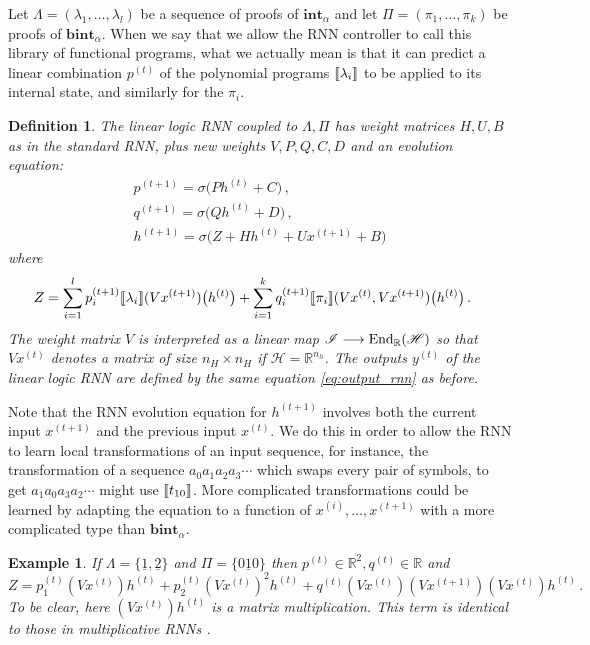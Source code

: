 \documentclass[english,letter paper,12pt,leqno]{article}
\theoremstyle{example}
\newtheorem{definition}[theorem]{Definition}
\newtheorem{example}[theorem]{Example}
\numberwithin{equation}{section}
\DeclareMathOperator{\End}{End}
\begin{document}
Let $\Lambda = (\lambda_1,\ldots,\lambda_l)$ be a sequence of proofs of $\textbf{int}_\alpha$ and let $\Pi = (\pi_1,\ldots,\pi_k)$ be proofs of $\textbf{bint}_\alpha$. When we say that we allow the RNN controller to call this library of functional programs, what we actually mean is that it can predict a linear combination $p^{(t)}$ of the polynomial programs $\llbracket \lambda_i \rrbracket$ to be applied to its internal state, and similarly for the $\pi_i$.

\begin{definition} The \emph{linear logic} RNN coupled to $\Lambda, \Pi$ has weight matrices $H,U,B$ as in the standard RNN, plus new weights $V, P, Q, C, D$ and an evolution equation:
\begin{gather*}
p^{(t+1)} = \sigma\big( P h^{(t)} + C \big)\,,\\
q^{(t+1)} = \sigma\big( Q h^{(t)} + D \big)\,,\\
h^{(t+1)} = \sigma\Big( Z + H h^{(t)} + U x^{(t+1)} + B\Big)
\end{gather*}
where
\begin{align*}
Z &= \sum_{i=1}^l p^{(t+1)}_i \llbracket \lambda_i \rrbracket( Vx^{(t+1)} )\big( h^{(t)} \big) + \sum_{i=1}^k q^{(t+1)}_i \llbracket \pi_i \rrbracket( Vx^{(t)}, Vx^{(t+1)})\big( h^{(t)} \big)\,.
\end{align*}
The weight matrix $V$ is interpreted as a linear map $\mathscr{I} \lto \End_{\mathbb{R}}(\mathscr{H})$ so that $Vx^{(t)}$ denotes a matrix of size $n_H \times n_H$ if $\mathscr{H} = \mathbb{R}^{n_h}$. The outputs $y^{(t)}$ of the linear logic RNN are defined by the same equation \eqref{eq:output_rnn} as before.
\end{definition}

Note that the RNN evolution equation for $h^{(t+1)}$ involves both the current input $x^{(t+1)}$ and the previous input $x^{(t)}$. We do this in order to allow the RNN to learn local transformations of an input sequence, for instance, the transformation of a sequence $a_0 a_1 a_2 a_3 \cdots$ which swaps every pair of symbols, to get $a_1 a_0 a_3 a_2 \cdots$ might use $\llbracket t_{10} \rrbracket$. More complicated transformations could be learned by adapting the equation to a function of $x^{(i)}, \ldots, x^{(t+1)}$ with a more complicated type than $\textbf{bint}_\alpha$.

\begin{example} If $\Lambda = \{ \underline{1}, \underline{2} \}$ and $\Pi = \{ \underline{010} \}$ then $p^{(t)} \in \mathbb{R}^2, q^{(t)} \in \mathbb{R}$ and
\[
Z = p_1^{(t)}( V x^{(t)} )h^{(t)} + p_2^{(t)} ( V x^{(t)} )^2 h^{(t)} + q^{(t)} (Vx^{(t)})(Vx^{(t+1)})(Vx^{(t)})h^{(t)}\,.
\]
To be clear, here $(Vx^{(t)}) h^{(t)}$ is a matrix multiplication. This term is identical to those in multiplicative RNNs \cite{??}.
\end{example}
\end{document}
